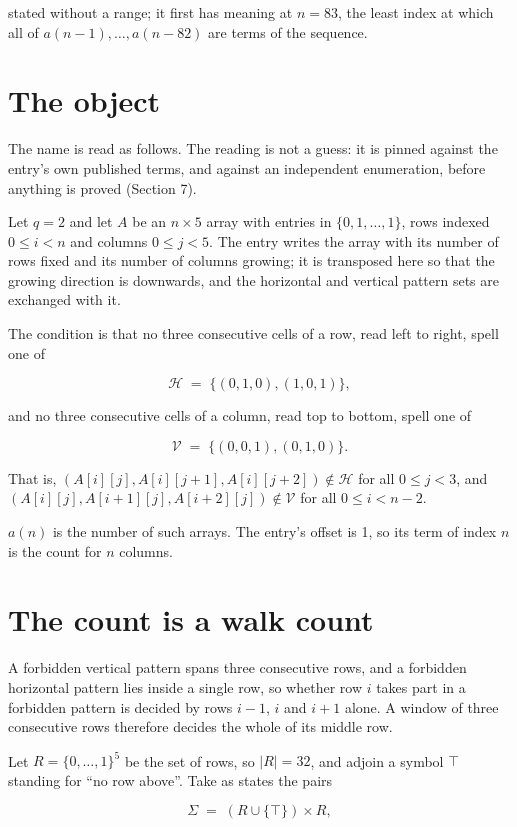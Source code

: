 \documentclass[11pt]{article}
\theoremstyle{definition}
\begin{document}
stated without a range; it first has meaning at $n = 83$, the least index at which all of $a(n-1),\dots,a(n-82)$ are terms of the sequence.

\section{The object}

The name is read as follows. The reading is not a guess: it is pinned against the entry's own published terms, and against an independent enumeration, before anything is proved (Section 7).

Let $q = 2$ and let $A$ be an $n \times 5$ array with entries in $\{0,1,\dots,1\}$, rows indexed $0 \le i < n$ and columns $0 \le j < 5$. The entry writes the array with its number of rows fixed and its number of columns growing; it is transposed here so that the growing direction is downwards, and the horizontal and vertical pattern sets are exchanged with it.

The condition is that no three consecutive cells of a row, read left to right, spell one of

\[\mathcal{H} \;=\; \{(0,1,0), (1,0,1)\},\]

and no three consecutive cells of a column, read top to bottom, spell one of

\[\mathcal{V} \;=\; \{(0,0,1), (0,1,0)\}.\]

That is, $(A[i][j],A[i][j{+}1],A[i][j{+}2]) \notin \mathcal{H}$ for all $0 \le j < 3$, and $(A[i][j],A[i{+}1][j],A[i{+}2][j]) \notin \mathcal{V}$ for all $0 \le i < n-2$.

$a(n)$ is the number of such arrays. The entry's offset is 1, so its term of index $n$ is the count for $n$ columns.

\section{The count is a walk count}

A forbidden vertical pattern spans three consecutive rows, and a forbidden horizontal pattern lies inside a single row, so whether row $i$ takes part in a forbidden pattern is decided by rows $i-1$, $i$ and $i+1$ alone. A window of three consecutive rows therefore decides the whole of its middle row.

Let $R = \{0,\dots,1\}^{5}$ be the set of rows, so $|R| = 32$, and adjoin a symbol $\top$ standing for ``no row above''. Take as states the pairs

\[\Sigma \;=\; (R \cup \{\top\}) \times R,\]
\end{document}

